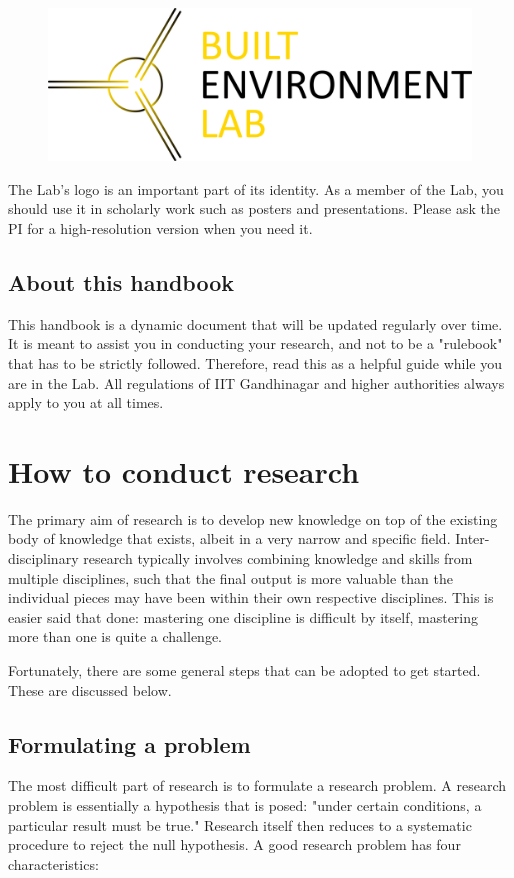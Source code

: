 \documentclass[12pt]{article}
\begin{document}
\begin{figure}[h]
	\centering
	\includegraphics[scale=0.075]{BEL-logo.png}
\end{figure}

The Lab's logo is an important part of its identity. As a member of the Lab, you should use it in scholarly work such as posters and presentations. Please ask the PI for a high-resolution version when you need it.

\subsection{About this handbook}
This handbook is a dynamic document that will be updated regularly over time. It is meant to assist you in conducting your research, and not to be a "rulebook" that has to be strictly followed. Therefore, read this as a helpful guide while you are in the Lab. All regulations of IIT Gandhinagar and higher authorities always apply to you at all times. 

\newpage
\section{How to conduct research}
The primary aim of research is to develop new knowledge on top of the existing body of knowledge that exists, albeit in a very narrow and specific field. Inter-disciplinary research typically involves combining knowledge and skills from multiple disciplines, such that the final output is more valuable than the individual pieces may have been within their own respective disciplines. This is easier said that done: mastering one discipline is difficult by itself, mastering more than one is quite a challenge. 

Fortunately, there are some general steps that can be adopted to get started. These are discussed below.

\subsection{Formulating a problem}
The most difficult part of research is to formulate a research problem. A research problem is essentially a hypothesis that is posed: "under certain conditions, a particular result must be true." Research itself then reduces to a systematic procedure to reject the null hypothesis. A good research problem has four characteristics:
\end{document}
